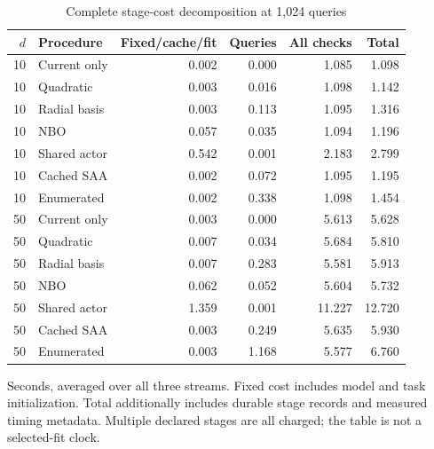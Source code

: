 \begin{table}[htbp]
\centering\small
\caption{Complete stage-cost decomposition at 1,024 queries}\label{tab:r19components}
\begin{tabular}{rlrrrr}
\toprule
$d$ & Procedure & Fixed/cache/fit & Queries & All checks & Total\\
\midrule
10 & Current only & 0.002 & 0.000 & 1.085 & 1.098\\
10 & Quadratic & 0.003 & 0.016 & 1.098 & 1.142\\
10 & Radial basis & 0.003 & 0.113 & 1.095 & 1.316\\
10 & NBO & 0.057 & 0.035 & 1.094 & 1.196\\
10 & Shared actor & 0.542 & 0.001 & 2.183 & 2.799\\
10 & Cached SAA & 0.002 & 0.072 & 1.095 & 1.195\\
10 & Enumerated & 0.002 & 0.338 & 1.098 & 1.454\\
50 & Current only & 0.003 & 0.000 & 5.613 & 5.628\\
50 & Quadratic & 0.007 & 0.034 & 5.684 & 5.810\\
50 & Radial basis & 0.007 & 0.283 & 5.581 & 5.913\\
50 & NBO & 0.062 & 0.052 & 5.604 & 5.732\\
50 & Shared actor & 1.359 & 0.001 & 11.227 & 12.720\\
50 & Cached SAA & 0.003 & 0.249 & 5.635 & 5.930\\
50 & Enumerated & 0.003 & 1.168 & 5.577 & 6.760\\
\bottomrule
\end{tabular}
\par\smallskip\begin{minipage}{.96\textwidth}\footnotesize Seconds, averaged over all three streams. Fixed cost includes model and task initialization. Total additionally includes durable stage records and measured timing metadata. Multiple declared stages are all charged; the table is not a selected-fit clock.\end{minipage}
\end{table}
